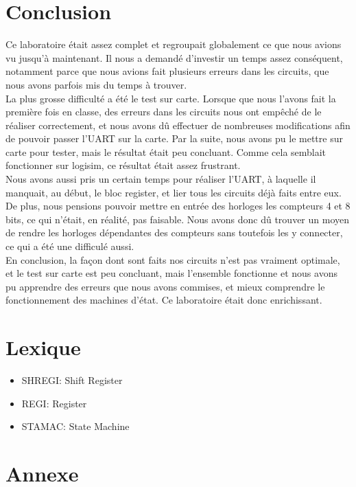 \documentclass[a4paper]{article} %
\begin{document}
\section {Conclusion}
\begin{tcolorbox}[colframe=Monokaimagenta,colback=white]
Ce laboratoire était assez complet et regroupait globalement ce que nous avions vu jusqu'à maintenant. Il nous a demandé d'investir un temps assez conséquent, notamment parce que nous avions fait plusieurs erreurs dans les circuits, que nous avons parfois mis du temps à trouver.\\
La plus grosse difficulté a été le test sur carte. Lorsque que nous l'avons fait la première fois en classe, des erreurs dans les circuits nous ont empêché de le réaliser correctement, et nous avons dû effectuer de nombreuses modifications afin de pouvoir passer l'UART sur la carte. Par la suite, nous avons pu le mettre sur carte pour tester, mais le résultat était peu concluant. Comme cela semblait fonctionner sur logisim, ce résultat était assez frustrant.\\
Nous avons aussi pris un certain temps pour réaliser l'UART, à laquelle il manquait, au début, le bloc register, et lier tous les circuits déjà faits entre eux. De plus, nous pensions pouvoir mettre en entrée des horloges les compteurs 4 et 8 bits, ce qui n'était, en réalité, pas faisable. Nous avons donc dû trouver un moyen de rendre les horloges dépendantes des compteurs sans toutefois les y connecter, ce qui a été une difficulé aussi.\\
En conclusion, la façon dont sont faits nos circuits n'est pas vraiment optimale, et le test sur carte est peu concluant, mais l'ensemble fonctionne et nous avons pu apprendre des erreurs que nous avons commises, et mieux comprendre le fonctionnement des machines d'état. Ce laboratoire était donc enrichissant.

\end{tcolorbox}

\section{Lexique}
\begin{itemize}
    \item     SHREGI: Shift Register
    \item     REGI: Register
    \item     STAMAC: State Machine
\end{itemize}


\section{Annexe}
\end{document}
